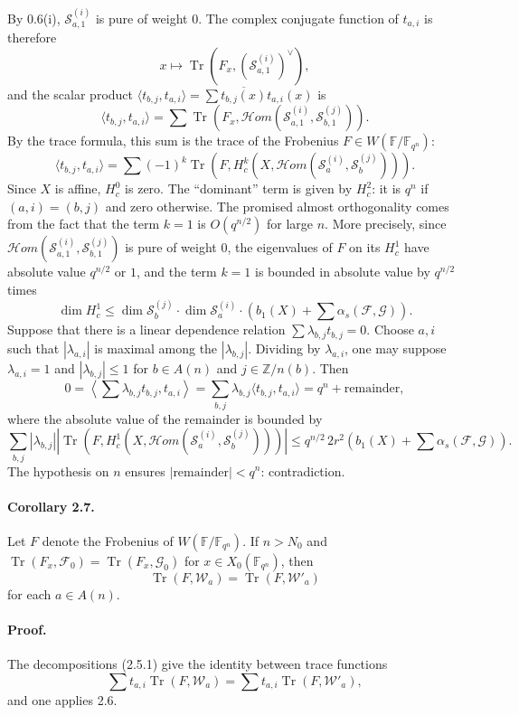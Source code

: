 \documentclass[10pt]{article}
\newcommand{\F}{\mathbb{F}}
\newcommand{\Z}{\mathbb{Z}}
\newcommand{\Tr}{\operatorname{Tr}}
\newcommand{\Hom}{\mathcal{H}om}
\begin{document}
By 0.6(i), $\mathcal S_{a,1}^{(i)}$ is pure of weight $0$.
The complex conjugate function of $t_{a,i}$ is therefore
\[
 x\longmapsto\Tr(F_x,(\mathcal S_{a,1}^{(i)})^\vee),
\]
and the scalar product $\langle t_{b,j},t_{a,i}\rangle=\sum \overline{t_{b,j}(x)}t_{a,i}(x)$ is
\[
 \langle t_{b,j},t_{a,i}\rangle=
 \sum \Tr(F_x,\Hom(\mathcal S_{a,1}^{(i)},\mathcal S_{b,1}^{(j)})).
\]
By the trace formula, this sum is the trace of the Frobenius $F\in W(\F/\F_{q^n})$:
\[
 \langle t_{b,j},t_{a,i}\rangle=
 \sum (-1)^k\Tr\left(F,H^k_c\left(X,\Hom(\mathcal S_a^{(i)},\mathcal S_b^{(j)})\right)\right).
\]
Since $X$ is affine, $H^0_c$ is zero.
The ``dominant'' term is given by $H^2_c$: it is $q^n$ if $(a,i)=(b,j)$ and zero otherwise.
The promised almost orthogonality comes from the fact that the term $k=1$ is $O(q^{n/2})$ for large $n$.
More precisely, since $\Hom(\mathcal S_{a,1}^{(i)},\mathcal S_{b,1}^{(j)})$ is pure of weight $0$, the eigenvalues of $F$ on its $H^1_c$ have absolute value $q^{n/2}$ or $1$, and the term $k=1$ is bounded in absolute value by $q^{n/2}$ times
\[
 \dim H^1_c\le \dim\mathcal S_b^{(j)}\cdot \dim\mathcal S_a^{(i)}\cdot\left(b_1(X)+\sum\alpha_s(\mathcal F,\mathcal G)\right).
\]
Suppose that there is a linear dependence relation $\sum \lambda_{b,j}t_{b,j}=0$.
Choose $a,i$ such that $|\lambda_{a,i}|$ is maximal among the $|\lambda_{b,j}|$.
Dividing by $\lambda_{a,i}$, one may suppose $\lambda_{a,i}=1$ and $|\lambda_{b,j}|\le1$ for $b\in A(n)$ and $j\in\Z/n(b)$.
Then
\[
0=\left\langle\sum \lambda_{b,j}t_{b,j},t_{a,i}\right\rangle
=\sum_{b,j}\lambda_{b,j}\langle t_{b,j},t_{a,i}\rangle
=q^n+\text{remainder},
\]
where the absolute value of the remainder is bounded by
\[
 \sum_{b,j}|\lambda_{b,j}|\left|\Tr\left(F,H^1_c(X,\Hom(\mathcal S_a^{(i)},\mathcal S_b^{(j)}))\right)\right|
 \le q^{n/2}\,2r^2\left(b_1(X)+\sum\alpha_s(\mathcal F,\mathcal G)\right).
\]
The hypothesis on $n$ ensures $|\text{remainder}|<q^n$: contradiction.

\paragraph{Corollary 2.7.}
Let $F$ denote the Frobenius of $W(\F/\F_{q^n})$.
If $n>N_0$ and $\Tr(F_x,\mathcal F_0)=\Tr(F_x,\mathcal G_0)$ for $x\in X_0(\F_{q^n})$, then
\[
 \Tr(F,\mathcal W_a)=\Tr(F,\mathcal W'_a)
\]
for each $a\in A(n)$.

\paragraph{Proof.}
The decompositions (2.5.1) give the identity between trace functions
\[
 \sum t_{a,i}\Tr(F,\mathcal W_a)=\sum t_{a,i}\Tr(F,\mathcal W'_a),
\]
and one applies 2.6.
\end{document}
